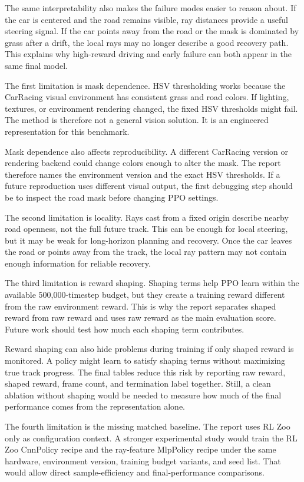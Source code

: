 \documentclass[conference]{IEEEtran}
\begin{document}
The same interpretability also makes the failure modes easier to reason about. If the car is centered and the road remains visible, ray distances provide a useful steering signal. If the car points away from the road or the mask is dominated by grass after a drift, the local rays may no longer describe a good recovery path. This explains why high-reward driving and early failure can both appear in the same final model.

The first limitation is mask dependence. HSV thresholding works because the CarRacing visual environment has consistent grass and road colors. If lighting, textures, or environment rendering changed, the fixed HSV thresholds might fail. The method is therefore not a general vision solution. It is an engineered representation for this benchmark.

Mask dependence also affects reproducibility. A different CarRacing version or rendering backend could change colors enough to alter the mask. The report therefore names the environment version and the exact HSV thresholds. If a future reproduction uses different visual output, the first debugging step should be to inspect the road mask before changing PPO settings.

The second limitation is locality. Rays cast from a fixed origin describe nearby road openness, not the full future track. This can be enough for local steering, but it may be weak for long-horizon planning and recovery. Once the car leaves the road or points away from the track, the local ray pattern may not contain enough information for reliable recovery.

The third limitation is reward shaping. Shaping terms help PPO learn within the available 500,000-timestep budget, but they create a training reward different from the raw environment reward. This is why the report separates shaped reward from raw reward and uses raw reward as the main evaluation score. Future work should test how much each shaping term contributes.

Reward shaping can also hide problems during training if only shaped reward is monitored. A policy might learn to satisfy shaping terms without maximizing true track progress. The final tables reduce this risk by reporting raw reward, shaped reward, frame count, and termination label together. Still, a clean ablation without shaping would be needed to measure how much of the final performance comes from the representation alone.

The fourth limitation is the missing matched baseline. The report uses RL Zoo only as configuration context. A stronger experimental study would train the RL Zoo CnnPolicy recipe and the ray-feature MlpPolicy recipe under the same hardware, environment version, training budget variants, and seed list. That would allow direct sample-efficiency and final-performance comparisons.
\end{document}
